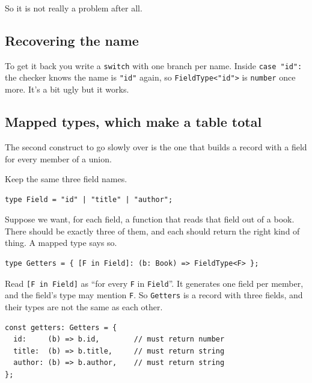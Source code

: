 \documentclass[11pt,a4paper]{article}
\begin{document}
\begin{pinkbox}
So it is not really a problem after all.

\subsection{Recovering the name}

To get it back you write a \texttt{switch} with one branch per name. Inside \texttt{case "id":} the
checker knows the name is \texttt{"id"} again, so \texttt{FieldType<"id">} is \texttt{number} once
more. It's a bit ugly but it works.

\end{pinkbox}

\newpage

\begin{pinkbox}
\section{Mapped types, which make a table total}
\label{sec:mapped}

The second construct to go slowly over is the one that builds a record with a field for every
member of a union.

Keep the same three field names.

\begin{lstlisting}[language=TS]
type Field = "id" | "title" | "author";
\end{lstlisting}

Suppose we want, for each field, a function that reads that field out of a book. There should be
exactly three of them, and each should return the right kind of thing. A mapped type says so.

\begin{lstlisting}[language=TS]
type Getters = { [F in Field]: (b: Book) => FieldType<F> };
\end{lstlisting}

Read \texttt{[F in Field]} as ``for every \texttt{F} in \texttt{Field}''. It generates one field
per member, and the field's type may mention \texttt{F}. So \texttt{Getters} is a record with three
fields, and their types are not the same as each other.

\begin{lstlisting}[language=TS]
const getters: Getters = {
  id:     (b) => b.id,        // must return number
  title:  (b) => b.title,     // must return string
  author: (b) => b.author,    // must return string
};
\end{lstlisting}


\end{pinkbox}
\end{document}
